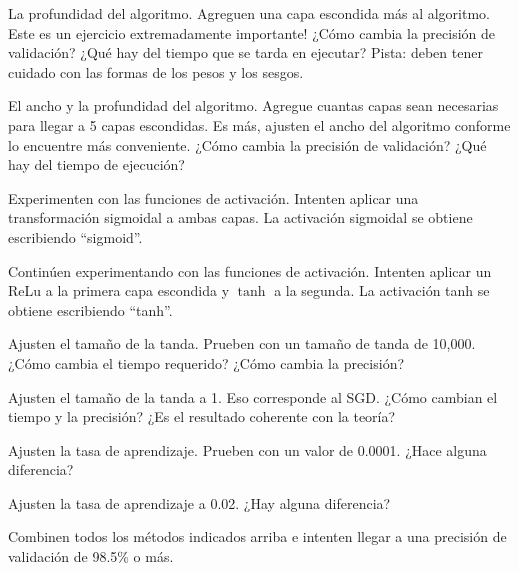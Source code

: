 \begin{problema}
	La profundidad del algoritmo.  Agreguen una capa escondida más al algoritmo. Este es un ejercicio extremadamente importante!  ¿Cómo cambia la precisión de validación?  ¿Qué hay del tiempo que se tarda en ejecutar?   Pista:  deben tener cuidado con las formas de los pesos y los sesgos.
\end{problema}
\begin{problema}
	El ancho y la profundidad del algoritmo.  Agregue cuantas capas sean necesarias para llegar a 5 capas escondidas.  Es más, ajusten el ancho del algoritmo conforme lo encuentre más conveniente.  ¿Cómo cambia la precisión de validación? ¿Qué hay del tiempo de ejecución?
\end{problema}
\begin{problema}
	Experimenten con las funciones de activación.  Intenten aplicar una transformación sigmoidal a ambas capas.  La activación sigmoidal se obtiene escribiendo “sigmoid”.
\end{problema}
\begin{problema}
	Continúen experimentando con las funciones de activación.  Intenten aplicar un ReLu a la primera capa escondida y $\tanh$ a la segunda.  La activación tanh se obtiene escribiendo “tanh”.
\end{problema}
\begin{problema}
	Ajusten el tamaño de la tanda.  Prueben con un tamaño de tanda de 10,000.  ¿Cómo cambia el tiempo requerido?  ¿Cómo cambia la precisión?
\end{problema}
\begin{problema}
	Ajusten el tamaño de la tanda a 1.  Eso corresponde al SGD. ¿Cómo cambian el tiempo y la precisión?  ¿Es el resultado coherente con la teoría?
\end{problema}
\begin{problema}
	Ajusten la tasa de aprendizaje.  Prueben con un valor de 0.0001.  ¿Hace alguna diferencia?
\end{problema}
\begin{problema}
	Ajusten la tasa de aprendizaje a 0.02.  ¿Hay alguna diferencia?
\end{problema}
\begin{problema}
	Combinen todos los métodos indicados arriba e intenten llegar a una precisión de validación de 98.5\% o más.
\end{problema}








